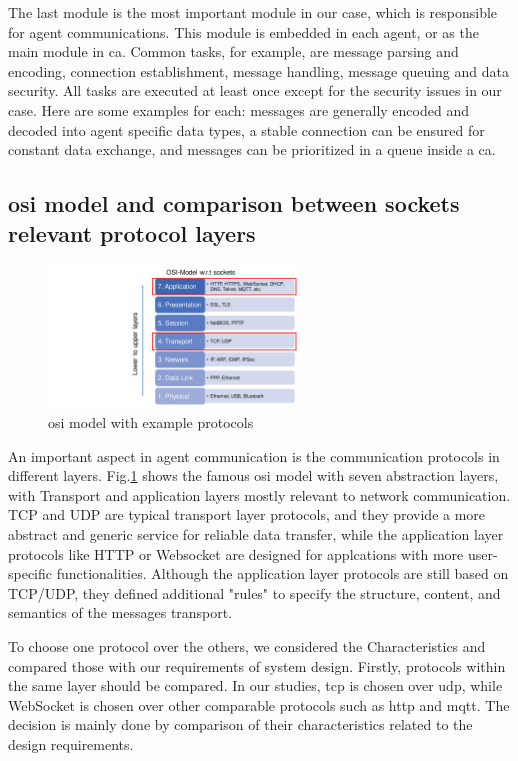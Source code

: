 The last module is the most important module in our case, which is responsible for agent 
communications. This module is embedded in each agent, or as the main module in \gls{ca}. 
Common tasks, for example, are message parsing and encoding, connection 
establishment, message handling, message queuing and data security. 
All tasks are executed at least once 
except for the security issues in our case. Here are some examples for each: 
messages are generally encoded and decoded into agent specific data types, a stable 
connection can be ensured for constant data exchange, and messages can be prioritized in a 
queue inside a \gls{ca}. 


\subsection{\gls{osi} model and comparison between sockets relevant protocol layers}
\begin{figure}[htbp]
\includegraphics[width=0.6\textwidth]{figures/OSI.pdf}
\centering
\caption{\gls{osi} model with example protocols \label{fig: OSI}}
\end{figure}

An important aspect in agent communication is the communication protocols 
in different layers. 
Fig.\ref{fig: OSI} shows the famous \gls{osi} model with seven abstraction layers, with Transport and 
application layers mostly relevant to network communication. TCP and UDP are typical transport layer 
protocols, and they provide a more abstract and generic service for reliable data transfer, 
while the application layer protocols like HTTP or Websocket are designed for applcations with 
more user-specific functionalities. Although the application layer protocols are still based on 
TCP/UDP, they defined additional "rules" to 
specify the structure, content, and semantics of the messages transport. 


To choose one protocol over the others, we considered the Characteristics and compared 
those with our requirements of system design. Firstly, 
protocols within the same layer should be compared. In our studies, \gls{tcp} is chosen 
over \gls{udp}, while WebSocket is chosen over other comparable protocols 
such as \gls{http} and \gls{mqtt}. The decision is mainly done by comparison of their 
characteristics related to the design requirements. 



